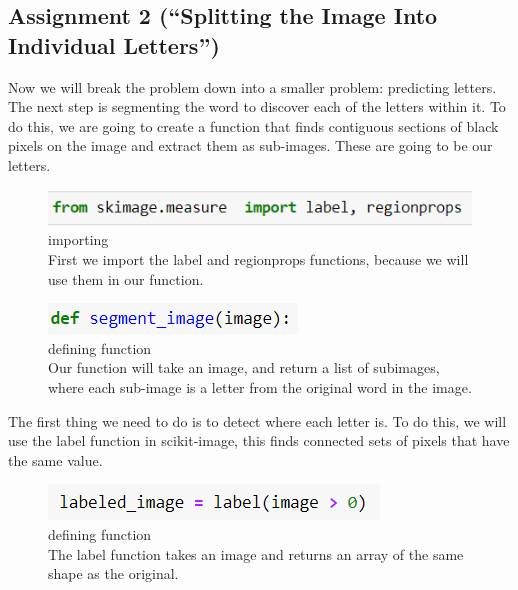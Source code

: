 \documentclass[onecolumn]{article}
\begin{document}
\subsection{Assignment 2 (``Splitting the Image Into Individual Letters'')}
\begin{t}
Now we will break the problem down into a smaller problem: predicting letters. The next step is segmenting the word to discover each of the letters within it. To do this, we are going to create a function that finds contiguous sections of black pixels on the image and extract them as sub-images. These are going to be our letters.
\end{t}

\begin{figure}[hb!]
    \centering
    \includegraphics[width=.5\linewidth]{10..png}
\caption{\label{fig:demo-bad}
\centering
importing\\First we import the label and regionprops functions, because we will use them in our function.}
\end{figure}

\begin{figure}[hb!]
    \centering
    \includegraphics[width=.3\linewidth]{11..png}
\caption{\label{fig:demo-bad}
\centering
defining function\\Our function will take an image, and return a list of subimages, where each sub-image is a letter from the original word in the image.}
\end{figure}

\newpage
\begin{t}
The first thing we need to do is to detect where each letter is. To do this, we will use the label function in scikit-image, this finds connected sets of pixels that have the same value.
\end{t}

\begin{figure}[h]
    \centering
    \includegraphics[width=.5\linewidth]{12..png}
\caption{\label{fig:demo-bad}
\centering
defining function\\The label function takes an image and returns an array of the same shape as the
original.}
\end{figure}
\end{document}
